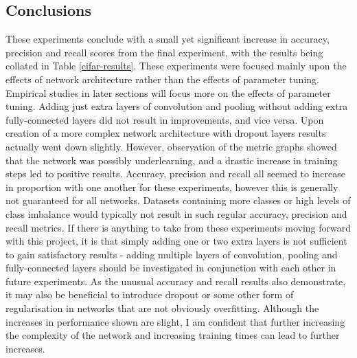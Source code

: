 \documentclass[12pt]{report}
\begin{document}
\begin{flushleft}
\vspace{0.5cm}
\section{Conclusions}
These experiments conclude with a small yet significant increase in accuracy, precision and recall scores from the final experiment, with the results being collated in Table \ref{cifar-results}. These experiments were focused mainly upon the effects of network architecture rather than the effects of parameter tuning. Empirical studies in later sections will focus more on the effects of parameter tuning. Adding just extra layers of convolution and pooling without adding extra fully-connected layers did not result in improvements, and vice versa. Upon creation of a more complex network architecture with dropout layers results actually went down slightly. However, observation of the metric graphs showed that the network was possibly underlearning, and a drastic increase in training steps led to positive results. Accuracy, precision and recall all seemed to increase in proportion with one another for these experiments, however this is generally not guaranteed for all networks. Datasets containing more classes or high levels of class imbalance would typically not result in such regular accuracy, precision and recall metrics. If there is anything to take from these experiments moving forward with this project, it is that simply adding one or two extra layers is not sufficient to gain satisfactory results - adding multiple layers of convolution, pooling and fully-connected layers should be investigated in conjunction with each other in future experiments. As the unusual accuracy and recall results also demonstrate, it may also be beneficial to introduce dropout or some other form of regularisation in networks that are not obviously overfitting. Although the increases in performance shown are slight, I am confident that further increasing the complexity of the network and increasing training times can lead to further increases.
\end{flushleft}
\end{document}
